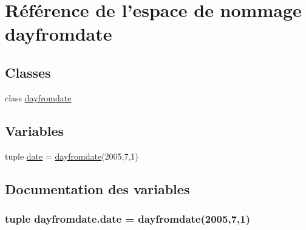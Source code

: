 \hypertarget{namespacedayfromdate}{\section{Référence de l'espace de nommage dayfromdate}
\label{namespacedayfromdate}
}
\subsection*{Classes}
\begin{DoxyCompactItemize}
\item 
class \hyperlink{classdayfromdate_1_1dayfromdate}{dayfromdate}
\end{DoxyCompactItemize}
\subsection*{Variables}
\begin{DoxyCompactItemize}
\item 
tuple \hyperlink{namespacedayfromdate_aff2b24216941c68bc2f62c556efb05ce}{date} = \hyperlink{classdayfromdate_1_1dayfromdate}{dayfromdate}(2005,7,1)
\end{DoxyCompactItemize}


\subsection{Documentation des variables}
\hypertarget{namespacedayfromdate_aff2b24216941c68bc2f62c556efb05ce}{
\subsubsection[{date}]{\setlength{\rightskip}{0pt plus 5cm}tuple dayfromdate.\-date = {\bf dayfromdate}(2005,7,1)}}\label{namespacedayfromdate_aff2b24216941c68bc2f62c556efb05ce}
